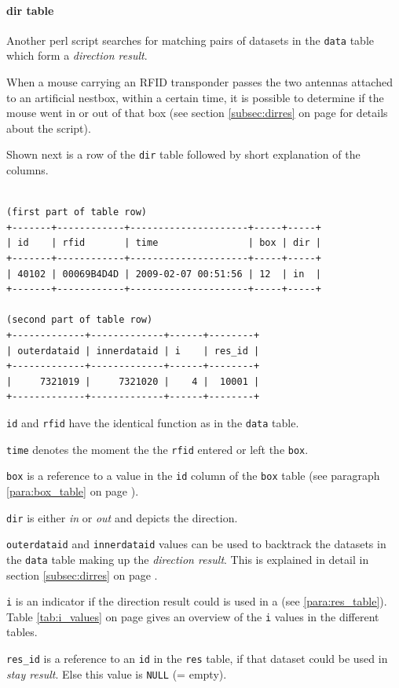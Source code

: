 \paragraph{dir table}
\label{para:dir_table}
Another \ac{perl} script searches for matching pairs of datasets in the \lstinline|data| table which form a \textit{direction result}.

When a mouse carrying an \ac{RFID} transponder passes the two antennas attached to an artificial nestbox, within a certain time, it is possible to determine if the mouse went in or out of that box (see section \ref{subsec:dirres} on page \pageref{subsec:dirres} for details about the script). 

Shown next is a row of the \lstinline|dir| table followed by short explanation of the columns.

\codescript
\begin{lstlisting}[frame=none]

(first part of table row)
+-------+------------+---------------------+-----+-----+
| id    | rfid       | time                | box | dir |
+-------+------------+---------------------+-----+-----+
| 40102 | 00069B4D4D | 2009-02-07 00:51:56 | 12  | in  |
+-------+------------+---------------------+-----+-----+

(second part of table row)
+-------------+-------------+------+--------+
| outerdataid | innerdataid | i    | res_id |
+-------------+-------------+------+--------+
|     7321019 |     7321020 |    4 |  10001 | 
+-------------+-------------+------+--------+
\end{lstlisting}

\begin{mydesc}
  \item \lstinline|id| and \lstinline|rfid| have the identical function as in the \lstinline|data| table.
  \item \lstinline|time| denotes the moment the the \lstinline|rfid| entered or left the \lstinline|box|.
  \item \lstinline|box| is a reference to a value in the \lstinline|id| column of the \lstinline|box| table (see paragraph \ref{para:box_table} on page \pageref{para:box_table}).
  \item \lstinline|dir| is either \textit{in} or \textit{out} and depicts the direction.
  \item \lstinline|outerdataid| and \lstinline|innerdataid| values can be used to backtrack the datasets in the \lstinline|data| table making up the \textit{direction result}. This is explained in detail in section \ref{subsec:dirres} on page \pageref{subsec:dirres}.
  \item \lstinline|i| is an indicator if the direction result could is used in a \textit{} (see \ref{para:res_table}). Table \ref{tab:i_values} on page \pageref{tab:i_values} gives an overview of the \lstinline|i| values in the different tables.
  \item \lstinline|res_id| is a reference to an \lstinline|id| in the \lstinline|res| table, if that dataset could be used in \textit{stay result}. Else this value is \lstinline|NULL| (= empty).
\end{mydesc}

